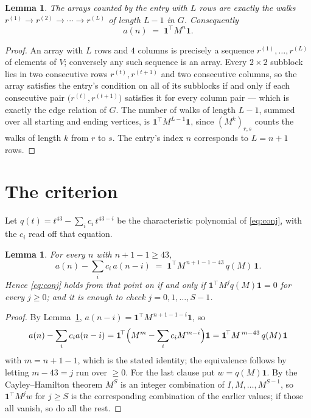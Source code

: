 \documentclass[11pt,a4paper]{article}
\theoremstyle{plain}
\newtheorem{lemma}[theorem]{Lemma}
\theoremstyle{definition}
\begin{document}
\begin{lemma}\label{lem:walk}
The arrays counted by the entry with $L$ rows are exactly the walks
$r^{(1)}\to r^{(2)}\to\cdots\to r^{(L)}$ of length $L-1$ in $G$. Consequently
\[
a(n)\;=\;\mathbf{1}^{\!\top}M^{n}\mathbf{1} .
\]
\end{lemma}

\begin{proof}
An array with $L$ rows and $4$ columns is precisely a sequence
$r^{(1)},\dots,r^{(L)}$ of elements of $V$; conversely any such sequence is an array.
Every $2\times2$ subblock lies in two consecutive rows $r^{(t)},r^{(t+1)}$ and two
consecutive columns, so the array satisfies the entry's condition on all of its subblocks
if and only if each consecutive pair $\bigl(r^{(t)},r^{(t+1)}\bigr)$ satisfies it for
every column pair --- which is exactly the edge relation of $G$. The number of walks of
length $L-1$, summed over all starting and ending vertices, is
$\mathbf{1}^{\!\top}M^{L-1}\mathbf{1}$, since $(M^{k})_{r,s}$ counts the walks of
length $k$ from $r$ to $s$. The entry's index $n$ corresponds to $L=n+1$ rows.
\end{proof}

\section{The criterion}

Let $q(t)=t^{43}-\sum_i c_i\,t^{43-i}$ be the characteristic polynomial of
\eqref{eq:conj}, with the $c_i$ read off that equation.

\begin{lemma}\label{lem:crit}
For every $n$ with $n+1-1\ge43$,
\[
a(n)-\sum_i c_i\,a(n-i)\;=\;\mathbf{1}^{\!\top}M^{\,n+1-1-43}\,q(M)\,\mathbf{1} .
\]
Hence \eqref{eq:conj} holds from that point on if and only if
$\mathbf{1}^{\!\top}M^{j}q(M)\mathbf{1}=0$ for every $j\ge0$; and it is enough to check
$j=0,1,\dots,S-1$.
\end{lemma}

\begin{proof}
By Lemma~\ref{lem:walk}, $a(n-i)=\mathbf{1}^{\!\top}M^{\,n+1-1-i}\mathbf{1}$, so
\[
a(n)-\sum_i c_i a(n-i)
=\mathbf{1}^{\!\top}\Bigl(M^{m}-\sum_i c_i M^{m-i}\Bigr)\mathbf{1}
=\mathbf{1}^{\!\top}M^{\,m-43}\,q(M)\,\mathbf{1}
\]
with $m=n+1-1$, which is the stated identity; the equivalence follows by letting
$m-43=j$ run over $\ge0$. For the last clause put $w=q(M)\mathbf{1}$. By the
Cayley--Hamilton theorem $M^{S}$ is an integer combination of $I,M,\dots,M^{S-1}$, so
$\mathbf{1}^{\!\top}M^{j}w$ for $j\ge S$ is the corresponding combination of the earlier
values; if those all vanish, so do all the rest.
\end{proof}
\end{document}
